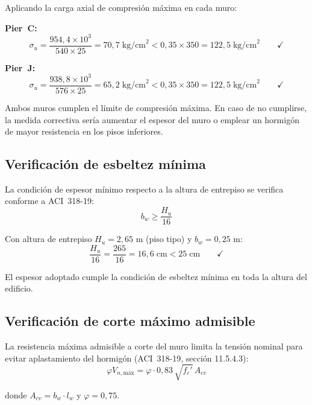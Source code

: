 Aplicando la carga axial de compresión máxima en cada muro:

\textbf{Pier~C:}
\begin{equation}
    \sigma_u = \frac{954{,}4 \times 10^3}{540 \times 25} = 70{,}7\;\text{kg/cm}^2
    < 0{,}35 \times 350 = 122{,}5\;\text{kg/cm}^2 \qquad \checkmark
\end{equation}

\textbf{Pier~J:}
\begin{equation}
    \sigma_u = \frac{938{,}8 \times 10^3}{576 \times 25} = 65{,}2\;\text{kg/cm}^2
    < 0{,}35 \times 350 = 122{,}5\;\text{kg/cm}^2 \qquad \checkmark
\end{equation}

Ambos muros cumplen el límite de compresión máxima. En caso de no cumplirse, la medida
correctiva sería aumentar el espesor del muro o emplear un hormigón de mayor resistencia en
los pisos inferiores.

\subsection{Verificación de esbeltez mínima}

La condición de espesor mínimo respecto a la altura de entrepiso se verifica conforme a
ACI~318-19:
\begin{equation}
    b_w \geq \frac{H_u}{16}
\end{equation}

Con altura de entrepiso $H_u = 2{,}65$ m (piso tipo) y $b_w = 0{,}25$ m:
\begin{equation}
    \frac{H_u}{16} = \frac{265}{16} = 16{,}6\;\text{cm} < 25\;\text{cm} \qquad \checkmark
\end{equation}

El espesor adoptado cumple la condición de esbeltez mínima en toda la altura del edificio.

\subsection{Verificación de corte máximo admisible}

La resistencia máxima admisible a corte del muro limita la tensión nominal para evitar
aplastamiento del hormigón (ACI~318-19, sección 11.5.4.3):
\begin{equation}
    \varphi V_{n,\text{máx}} = \varphi \cdot 0{,}83\,\sqrt{f_c'}\,A_{cv}
\end{equation}

donde $A_{cv} = b_w \cdot l_w$ y $\varphi = 0{,}75$.

